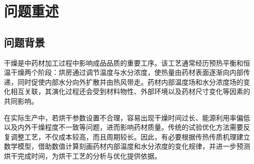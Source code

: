 \documentclass[12pt,a4paper,fontset=none]{ctexart}
\newcommand{\problem}[1]{\par\noindent\hspace*{2em}\textbf{针对问题#1}\quad}
\begin{document}
\begin{abstract}
\problem{四}该问题需同时考虑药材失水引起的径向收缩。依据附件半径数据构造 $R(t)$ 的分段线性插值函数，并引入无量纲坐标 $\xi=r/R(t)$（$0\le \xi\le 1$），将随时间变化的物理区域映射至固定计算区间。坐标变换后，在热传导与水分扩散方程中加入网格运动项 $\xi\dot R(t)/R(t)$ 及尺度因子 $1/R^2(t)$，结合附录四给出的物性关系，在固定 $\xi$ 网格上继续采用有限体积法与 BDF 求解，并以 $\max_i C_i<0.15\,\mathrm{kg/kg}$ 作为终止条件。为区分物性变化与几何收缩的影响，分别计算“固定半径--附录三物性”“固定半径--附录四物性”和“动态半径--附录四物性”三组方案。完整收缩模型的主要结果为：连续理论达标时刻 $t_{\mathrm{continuous}}=189768.43\,\mathrm{s}$（$52.7135\,\mathrm h$），安全输出时刻 $t_{\mathrm{dry}}=189780\,\mathrm{s}$（$52.7167\,\mathrm h$），此时药材半径收缩至 $R(t_{\mathrm{dry}})=1.2000\,\mathrm{cm}$，最大含水率 $\max_i C_i=0.14999407\,\mathrm{kg/kg}$。与问题三相比，烘干时长缩短 $17520\,\mathrm{s}$（$4.8667\,\mathrm h$），降幅为 $8.45\%$；与采用附录四物性但保持固定半径的对照模型相比，烘干时长缩短 $77.3000\,\mathrm h$，降幅为 $59.45\%$，干燥速度提高至原来的 $2.466$ 倍。结果说明，径向收缩通过缩短水分扩散距离显著提高了烘干效率。

最后给出了建模过程的误差分析和结果检验，本文结论正确合理，具有一定的应用价值和普适性。

\vspace{0.6em}
\noindent\textbf{关键词：}热质耦合；有限体积法；BDF；非线性扩散；移动边界；药材烘干
\end{abstract}
\clearpage

\section{问题重述}

\subsection{问题背景}

干燥是中药材加工过程中影响成品品质的重要工序。该工艺通常经历预热平衡和恒温干燥两个阶段：烘房通过调节温度与水分浓度，使热量由药材表面逐渐向内部传递，同时促使内部水分向外扩散并由热风带走。药材内部温度场和水分浓度场的变化相互关联，其演化过程还会受到材料物性、外部环境以及药材尺寸变化等因素的共同影响。

在实际生产中，若烘干参数设置不合理，容易出现干燥时间过长、能源利用率偏低以及内外干燥程度不一致等问题，进而影响药材质量。传统的试验优化方法需要反复调整工艺，不仅成本较高，而且周期较长。因此，有必要根据传热传质机理建立数学模型，借助数值计算刻画药材内部温度和水分浓度的变化规律，并进一步预测烘干完成时间，为烘干工艺的分析与优化提供依据。
\end{document}
